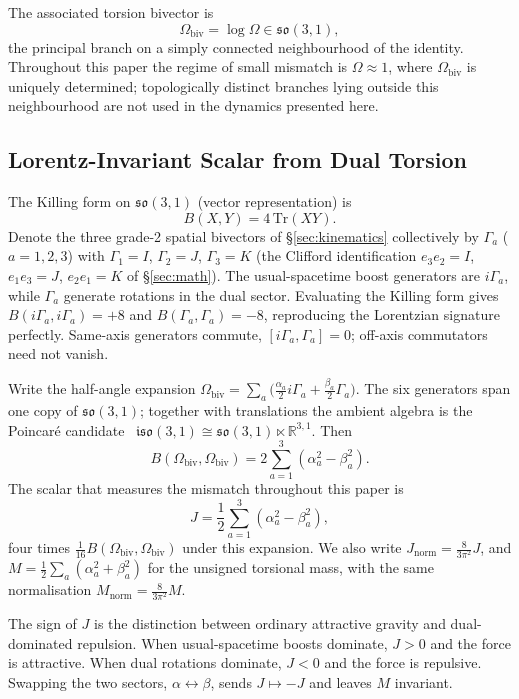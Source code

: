 \documentclass[a4paper]{article}
\newcommand{\Jnorm}{J_{\mathrm{norm}}}
\newcommand{\Mnorm}{M_{\mathrm{norm}}}
\begin{document}
The associated torsion bivector is
\[
\Omega_\text{biv} = \log \Omega \in \mathfrak{so}(3,1),
\]
the principal branch on a simply connected neighbourhood of the identity. Throughout this paper the regime of small mismatch is $\Omega \approx 1$, where $\Omega_\text{biv}$ is uniquely determined; topologically distinct branches lying outside this neighbourhood are not used in the dynamics presented here.

\subsection{Lorentz-Invariant Scalar from Dual Torsion}

The Killing form on $\mathfrak{so}(3,1)$ (vector representation) is
\[
B(X,Y) = 4\,\mathrm{Tr}(X Y).
\]
Denote the three grade-2 spatial bivectors of \S\ref{sec:kinematics} collectively by $\Gamma_a$ ($a=1,2,3$) with $\Gamma_1 = I$, $\Gamma_2 = J$, $\Gamma_3 = K$ (the Clifford identification $e_3e_2 = I$, $e_1e_3 = J$, $e_2e_1 = K$ of \S\ref{sec:math}). The usual-spacetime boost generators are $i\Gamma_a$, while $\Gamma_a$ generate rotations in the dual sector. Evaluating the Killing form gives $B(i\Gamma_a, i\Gamma_a) = +8$ and $B(\Gamma_a, \Gamma_a) = -8$, reproducing the Lorentzian signature perfectly. Same-axis generators commute, $[i\Gamma_a,\Gamma_a]=0$; off-axis commutators need not vanish.

Write the half-angle expansion $\Omega_\text{biv}=\sum_a\bigl(\frac{\alpha_a}{2}i\Gamma_a+\frac{\beta_a}{2}\Gamma_a\bigr)$. The six generators span one copy of $\mathfrak{so}(3,1)$; together with translations the ambient algebra is the Poincar\'e candidate~\cite{poincare1906} $\mathfrak{iso}(3,1)\cong\mathfrak{so}(3,1)\ltimes\mathbb{R}^{3,1}$. Then
\[
B(\Omega_\text{biv},\Omega_\text{biv})=2\sum_{a=1}^3(\alpha_a^2-\beta_a^2).
\]
The scalar that measures the mismatch throughout this paper is
\begin{equation}
\label{eq:J-def}
J=\frac12\sum_{a=1}^3(\alpha_a^2-\beta_a^2),
\end{equation}
four times $\frac1{16}B(\Omega_\text{biv},\Omega_\text{biv})$ under this expansion. We also write $\Jnorm=\frac8{3\pi^2}J$, and $M=\frac12\sum_a(\alpha_a^2+\beta_a^2)$ for the unsigned torsional mass, with the same normalisation $\Mnorm=\frac8{3\pi^2}M$.

The sign of $J$ is the distinction between ordinary attractive gravity and dual-dominated repulsion. When usual-spacetime boosts dominate, $J>0$ and the force is attractive. When dual rotations dominate, $J<0$ and the force is repulsive. Swapping the two sectors, $\alpha\leftrightarrow\beta$, sends $J\mapsto -J$ and leaves $M$ invariant.
\end{document}
